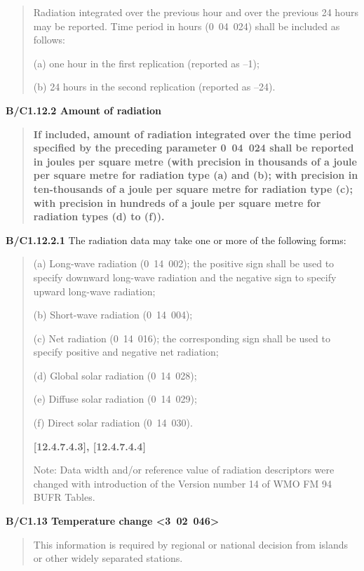 \begin{quote}
Radiation integrated over the previous hour and over the previous 24 hours may be reported. Time period in hours (0~04~024) shall be included as follows:

(a) one hour in the first replication (reported as --1);

(b) 24 hours in the second replication (reported as --24).
\end{quote}

\textbf{B/C1.12.2 Amount of radiation}

\begin{quote}
\textbf{If included, amount of radiation integrated over the time period specified by the preceding parameter 0~04~024 shall be reported in joules per square metre (with precision in thousands of a joule per square metre for radiation type (a) and (b); with precision in ten-thousands of a joule per square metre for radiation type (c); with precision in hundreds of a joule per square metre for radiation types (d) to (f)).}
\end{quote}

\textbf{B/C1.12.2.1} The radiation data may take one or more of the following forms:

\begin{quote}
(a) Long-wave radiation (0~14~002); the positive sign shall be used to specify downward long-wave radiation and the negative sign to specify upward long-wave radiation;

(b) Short-wave radiation (0~14~004);

(c) Net radiation (0~14~016); the corresponding sign shall be used to specify positive and negative net radiation;

(d) Global solar radiation (0~14~028);

(e) Diffuse solar radiation (0~14~029);

(f) Direct solar radiation (0~14~030).

\textbf{{[}12.4.7.4.3{]}, {[}12.4.7.4.4{]}}

Note: Data width and/or reference value of radiation descriptors were changed with introduction of the Version number 14 of WMO FM 94 BUFR Tables.
\end{quote}

\textbf{B/C1.13 Temperature change \textless3~02~046\textgreater{}}

\begin{quote}
This information is required by regional or national decision from islands or other widely separated stations.
\end{quote}

